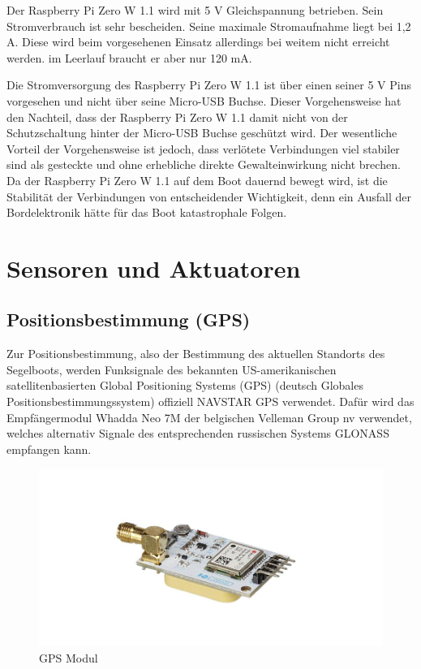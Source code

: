 Der Raspberry Pi Zero W 1.1 wird mit 5 V Gleichspannung betrieben. Sein Stromverbrauch ist sehr bescheiden. Seine maximale Stromaufnahme liegt bei 1,2 A. Diese wird beim vorgesehenen Einsatz allerdings bei weitem nicht erreicht werden.
\cite{noauthor_raspberry_2023} im Leerlauf braucht er aber nur 120 mA.
\cite{noauthor_stromverbrauch_nodate}

Die Stromversorgung des Raspberry Pi Zero W 1.1 ist über einen seiner 5 V Pins vorgesehen und nicht über seine Micro-USB Buchse. Dieser Vorgehensweise hat den Nachteil, dass der Raspberry Pi Zero W 1.1 damit nicht von der Schutzschaltung hinter der Micro-USB Buchse geschützt wird. Der wesentliche Vorteil der Vorgehensweise ist jedoch, dass verlötete Verbindungen viel stabiler sind als gesteckte und ohne erhebliche 
direkte Gewalteinwirkung nicht brechen. Da der Raspberry Pi Zero W 1.1 auf dem Boot dauernd bewegt wird, ist die Stabilität der Verbindungen von entscheidender Wichtigkeit, denn ein Ausfall der Bordelektronik hätte für das Boot katastrophale Folgen. 
\section{Sensoren und Aktuatoren}
\subsection{Positionsbestimmung (GPS)}
Zur Positionsbestimmung, also der Bestimmung des aktuellen Standorts des Segelboots, werden Funksignale des bekannten US-amerikanischen satellitenbasierten Global Positioning Systems (GPS) (deutsch Globales Positionsbestimmungssystem) offiziell NAVSTAR GPS verwendet. Dafür wird das Empfängermodul Whadda Neo 7M der belgischen Velleman Group nv verwendet, welches alternativ Signale des entsprechenden russischen Systems GLONASS empfangen kann.
\begin{figure}[H] 
    \centering
    \includegraphics[width=1\linewidth]{gps.png}
    \caption{GPS Modul}
    \label{fig:gps}
\end{figure}


